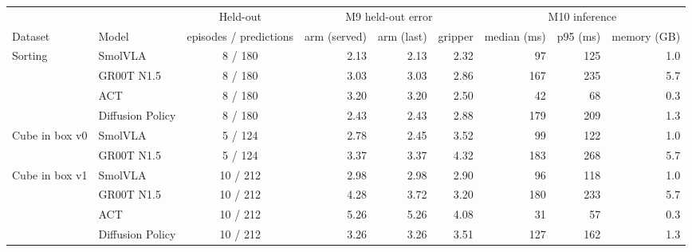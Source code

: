 \begin{tabular}{l l c rrr rrr}
\toprule
 & & Held-out & \multicolumn{3}{c}{M9 held-out error} & \multicolumn{3}{c}{M10 inference} \\
\cmidrule(lr){4-6}\cmidrule(lr){7-9}
Dataset & Model & episodes / predictions & arm (served) & arm (last) & gripper & median (ms) & p95 (ms) & memory (GB) \\
\midrule
Sorting & SmolVLA & 8 / 180 & 2.13 & 2.13 & 2.32 & 97 & 125 & 1.0 \\
 & GR00T N1.5 & 8 / 180 & 3.03 & 3.03 & 2.86 & 167 & 235 & 5.7 \\
 & ACT & 8 / 180 & 3.20 & 3.20 & 2.50 & 42 & 68 & 0.3 \\
 & Diffusion Policy & 8 / 180 & 2.43 & 2.43 & 2.88 & 179 & 209 & 1.3 \\
\addlinespace
Cube in box v0 & SmolVLA & 5 / 124 & 2.78 & 2.45 & 3.52 & 99 & 122 & 1.0 \\
 & GR00T N1.5 & 5 / 124 & 3.37 & 3.37 & 4.32 & 183 & 268 & 5.7 \\
\addlinespace
Cube in box v1 & SmolVLA & 10 / 212 & 2.98 & 2.98 & 2.90 & 96 & 118 & 1.0 \\
 & GR00T N1.5 & 10 / 212 & 4.28 & 3.72 & 3.20 & 180 & 233 & 5.7 \\
 & ACT & 10 / 212 & 5.26 & 5.26 & 4.08 & 31 & 57 & 0.3 \\
 & Diffusion Policy & 10 / 212 & 3.26 & 3.26 & 3.51 & 127 & 162 & 1.3 \\
\bottomrule
\end{tabular}
